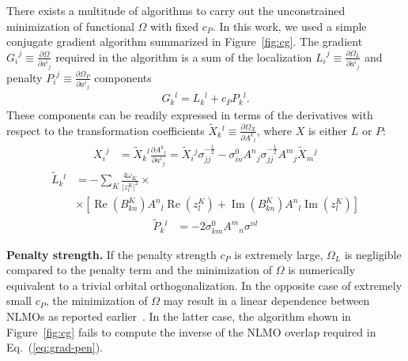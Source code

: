 \documentclass[aps,prl,reprint,amsmath,amssymb]{revtex4-1}
\begin{document}
There exists a multitude of algorithms to carry out the unconstrained minimization of functional $\Omega$ with fixed $c_P$. In this work, we used a simple conjugate gradient algorithm summarized in Figure~\ref{fig:cg}. The gradient ${G_i}^j \equiv \frac{\partial \Omega}{\partial {a^i}_j}$  required in the algorithm is a sum of the localization ${L_i}^j \equiv \frac{\partial \Omega_L}{\partial {a^i}_j}$ and penalty ${P_i}^j \equiv \frac{\partial \Omega_P}{\partial {a^i}_j}$ components
%
\begin{equation} \label{eq:grad}
\begin{split}
G{_k}^{l} = L{_k}^{l} + c_P P{_k}^{l}.
\end{split}
\end{equation}
%
These components can be readily expressed in terms of the derivatives with respect to the transformation coefficients $\tilde{X}{_k}^l \equiv \frac{\partial \Omega_X}{\partial {A^k}_l}$, where $X$ is either $L$ or $P$:
%
\begin{equation} \label{eq:grad-convert}
\begin{split}
{X_i}^j & = \tilde{X}{_k}^l \frac{\partial {A^k}_l}{\partial {a^i}_j} = \tilde{X}{_i}^j \sigma_{jj}^{-\frac{1}{2}} - \sigma_{in}^0 {A^n}_j  \sigma_{jj}^{-\frac{1}{2}} {A^m}_j \tilde{X}{_m}^j
\end{split}
\end{equation}
%
\begin{equation} \label{eq:grad-loc}
\begin{split}
\tilde{L}{_k}^l & = - \sum_K \frac{4 \omega_K}{\vert z_{l}^{K} \vert^2} \times \\ 
&\times \left[  \operatorname{Re}(B^{K}_{kn}) {A^{n}}_{l} \operatorname{Re}(z_{l}^{K}) + \operatorname{Im}(B^{K}_{kn}) {A^{n}}_{l} \operatorname{Im}(z_{l}^{K}) \right]
\end{split}
\end{equation}
%
\begin{equation} \label{eq:grad-pen}
\begin{split}
\tilde{P}{_k}^l & = -2 \sigma_{km}^0 {A^m}_n \sigma^{nl} 
\end{split}
\end{equation}
%

\textbf{Penalty strength.} If the penalty strength $c_P$ is extremely large, $\Omega_L$ is negligible compared to the penalty term and the minimization of $\Omega$ is numerically equivalent to a trivial orbital orthogonalization. In the opposite case of extremely small $c_P$, the minimization of $\Omega$ may result in a linear dependence between NLMOs as reported earlier~\cite{RZK}. %
In the latter case, the algorithm shown in Figure~\ref{fig:cg} fails to compute the inverse of the NLMO overlap required in Eq.~(\ref{eq:grad-pen}). 
\end{document}
